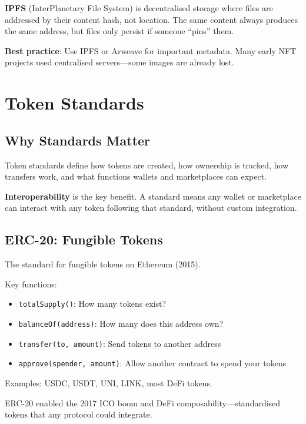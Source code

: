 \documentclass[11pt,a4paper]{article}
\newcommand{\keyword}[1]{\textbf{\textcolor{AccentOrange}{#1}}}
\begin{document}
\textbf{IPFS} (InterPlanetary File System) is decentralised storage where files are addressed by their content hash, not location. The same content always produces the same address, but files only persist if someone ``pins'' them.

\textbf{Best practice}: Use IPFS or Arweave for important metadata. Many early NFT projects used centralised servers---some images are already lost.

\section{Token Standards}

\subsection{Why Standards Matter}

Token standards define how tokens are created, how ownership is tracked, how transfers work, and what functions wallets and marketplaces can expect.

\keyword{Interoperability} is the key benefit. A standard means any wallet or marketplace can interact with any token following that standard, without custom integration.

\subsection{ERC-20: Fungible Tokens}

The standard for fungible tokens on Ethereum (2015).

Key functions:
\begin{itemize}
    \item \texttt{totalSupply()}: How many tokens exist?
    \item \texttt{balanceOf(address)}: How many does this address own?
    \item \texttt{transfer(to, amount)}: Send tokens to another address
    \item \texttt{approve(spender, amount)}: Allow another contract to spend your tokens
\end{itemize}

Examples: USDC, USDT, UNI, LINK, most DeFi tokens.

ERC-20 enabled the 2017 ICO boom and DeFi composability---standardised tokens that any protocol could integrate.
\end{document}
